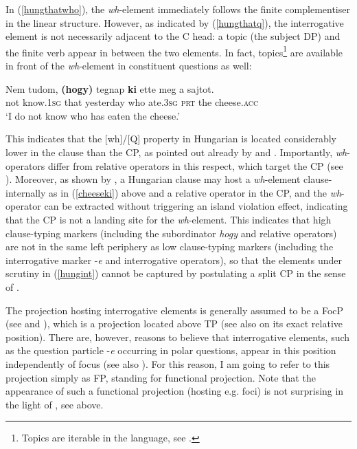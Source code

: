 In (\ref{hungthatwho}), the \textit{wh}-element immediately follows the finite complementiser in the linear structure. However, as indicated by (\ref{hungthatq}), the interrogative element is not necessarily adjacent to the C head: a topic (the subject DP) and the finite verb appear in between the two elements. In fact, topics\footnote{Topics are iterable in the language, see \citet{ekiss2002}.} are available in front of the \textit{wh}-element in constituent questions as well:

\ea \gll Nem tudom, \textbf{(hogy)} tegnap \textbf{ki} ette meg a sajtot. \label{cheeseki}\\
not know.\textsc{1sg} \phantom{\textbf{(}}that yesterday who ate.\textsc{3sg} \textsc{prt} the cheese.\textsc{acc}\\
\glt `I do not know who has eaten the cheese.'
\z 

This indicates that the [wh]/[Q] property in Hungarian is located considerably lower in the clause than the CP, as pointed out already by \citet{horvath1986} and \citet{ekiss2002}. Importantly, \textit{wh}-operators differ from relative operators in this respect, which target the CP (see \citealt{horvath1986}). Moreover, as shown by \citet{liptakzimmermann2007}, a Hungarian clause may host a \textit{wh}-element clause-internally as in (\ref{cheeseki}) above and a relative operator in the CP, and the \textit{wh}-operator can be extracted without triggering an island violation effect, indicating that the CP is not a landing site for the \textit{wh}-element. This indicates that high clause-typing markers (including the subordinator \textit{hogy} and relative operators) are not in the same left periphery as low clause-typing markers (including the interrogative marker -\textit{e} and interrogative operators), so that the elements under scrutiny in (\ref{hungint}) cannot be captured by postulating a split CP in the sense of \citet{rizzi1997}.

The projection hosting interrogative elements is generally assumed to be a FocP (see \citealt{ekiss2002} and \citealt{vancraenenbroeckliptak2006}), which is a projection located above TP (see also \citealt{ekiss2008li, ekiss2008} on its exact relative position). There are, however, reasons to believe that interrogative elements, such as the question particle -\textit{e} occurring in polar questions, appear in this position independently of focus (see also \citealt{bacskaiatkari2017atoh}). For this reason, I am going to refer to this projection simply as FP, standing for functional projection. Note that the appearance of such a functional projection (hosting e.g. foci) is not surprising in the light of \citet{poletto2006}, see  above. 

